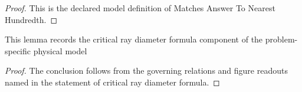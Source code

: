 \begin{proof}
  This is the declared model definition of Matches Answer To Nearest Hundredth.
\end{proof}
\begin{lemma}
  \label{lem:physics:phyx-mini-0022:phyxminiproblems-problemphyxmini0022-critical-ray-diameter-formula}
  This lemma records the critical ray diameter formula component of the problem-specific physical model
\end{lemma}
\begin{proof}
  The conclusion follows from the governing relations and figure readouts named in the statement of critical ray diameter formula.
\end{proof}
